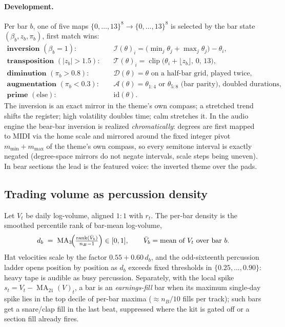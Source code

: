 \documentclass[11pt,a4paper]{article}
\begin{document}
\paragraph{Development.} Per bar $b$, one of five maps
$\{0,\dots,13\}^{8} \to \{0,\dots,13\}^{8}$ is selected by the bar state
$(\beta_b, z_b, \pi_b)$, first match wins:
\begin{align*}
\textbf{inversion } (\beta_b = 1):\quad & \mathcal I(\theta)_i =
  \bigl(\min\nolimits_j \theta_j + \max\nolimits_j \theta_j\bigr) - \theta_i,\\
\textbf{transposition } (|z_b| > 1.5):\quad & \mathcal T(\theta)_i =
  \operatorname{clip}\bigl(\theta_i + \lfloor z_b \rfloor,\, 0,\, 13\bigr),\\
\textbf{diminution } (\pi_b > 0.8):\quad & \mathcal D(\theta) =
  \theta \text{ on a half-bar grid, played twice},\\
\textbf{augmentation } (\pi_b < 0.3):\quad & \mathcal A(\theta) =
  \theta_{1:4} \text{ or } \theta_{5:8} \text{ (bar parity), doubled durations},\\
\textbf{prime } (\text{else}):\quad & \mathrm{id}(\theta).
\end{align*}
The inversion is an exact mirror in the theme's own compass; a stretched
trend shifts the register; high volatility doubles time; calm stretches it.
In the audio engine the bear-bar inversion is realized \emph{chromatically}:
degrees are first mapped to MIDI via the home scale and mirrored around the
fixed integer pivot $m_{\min} + m_{\max}$ of the theme's own compass, so
every semitone interval is exactly negated (degree-space mirrors do not
negate intervals, scale steps being uneven). In \textsf{bear} sections the
lead is the featured voice: the inverted theme over the pads.

\subsection{Trading volume as percussion density}\label{sec:v4volume}

Let $V_t$ be daily log-volume, aligned $1{:}1$ with $r_t$. The per-bar
density is the smoothed percentile rank of bar-mean log-volume,
\begin{equation}
d_b \;=\; \operatorname{MA}_3\!\Bigl(
  \tfrac{\mathrm{rank}(\bar V_b)}{n_B - 1} \Bigr) \in [0,1],
\qquad \bar V_b = \text{mean of } V_t \text{ over bar } b .
\end{equation}
Hat velocities scale by the factor $0.55 + 0.60\, d_b$, and the odd-sixteenth
percussion ladder opens position by position as $d_b$ exceeds fixed
thresholds in $\{0.25,\dots,0.90\}$: heavy tape is audible as busy
percussion. Separately, with the local spike $s_t = V_t -
\operatorname{MA}_{21}(V)_t$, a bar is an \emph{earnings-fill} bar when its
maximum single-day spike lies in the top decile of per-bar maxima
($\approx n_B/10$ fills per track); such bars get a snare/clap fill in the
last beat, suppressed where the kit is gated off or a section fill already
fires.
\end{document}
